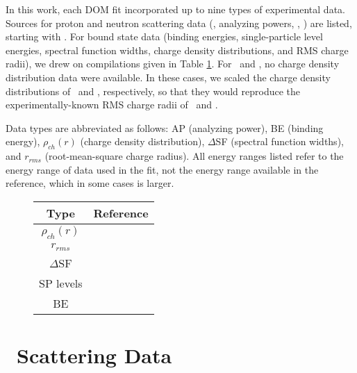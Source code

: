 \label{DOMDataSets}
In this work, each DOM fit incorporated up to nine types of experimental data. Sources for proton
and neutron scattering data (\el, analyzing powers, \rxn, \tot) are listed, starting with \oSix.
For bound state data (binding energies, single-particle level energies, spectral function widths,
charge density distributions, and RMS charge radii), we drew on compilations given in Table
\ref{BoundStateData}. For \oEight\ and \snTwelve, no charge density distribution data were
available. In these cases, we scaled the charge density distributions of \oSix\ and \snFour,
respectively, so that they would reproduce the experimentally-known RMS charge radii of
\oEight\ and \snTwelve.

Data types are abbreviated as follows: AP (analyzing power), BE (binding energy),
$\rho_{ch}(r)$ (charge density distribution), $\Delta$SF (spectral function widths), and
$r_{rms}$ (root-mean-square charge radius). All energy ranges listed refer to the energy range of 
data used in the fit, not the energy range available in the reference, which in some cases is larger.
\\
\begin{figure}[htp]
    \label{BoundStateData}
    \centering
    \begin{tabular}{c  c} 
        \toprule
        \bf{Type} & \bf{Reference} \\
        \midrule
        $\rho_{ch}(r)$ & \cite{DeVries1987}\\
        $r_{rms}$ & \cite{DeVries1987}\\
        $\Delta$SF & \cite{Jacob1966, Jacob1973}\\
        SP levels & \cite{AME2016}\\
        BE & \cite{AME2016}\\
        \bottomrule
    \end{tabular}
\end{figure}

\pagebreak
\section{\oSix\ Scattering Data}

\begin{figure}[htp]
    \small
    \hspace*{\fill}%
    \begin{minipage}[t]{0.47\linewidth}
        \centering
        \vspace{0pt}
        
    \end{minipage}%
    \hfill
    \begin{minipage}[t]{0.47\linewidth}
        \centering
        \vspace{0pt}
        
    \end{minipage}
    \hspace*{\fill}
\end{figure}

